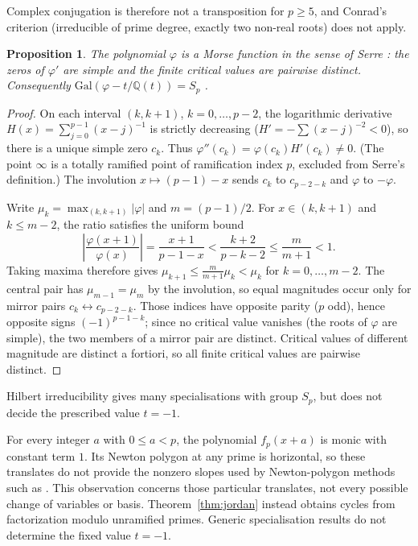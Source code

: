 \documentclass[11pt,a4paper]{amsart}
\newcommand{\Q}{\mathbb{Q}}
\newcommand{\Gal}{\mathrm{Gal}}
\theoremstyle{plain}
\newtheorem{proposition}[theorem]{Proposition}
\theoremstyle{definition}
\begin{document}
Complex conjugation is therefore not a transposition for \(p\ge5\), and Conrad's criterion (irreducible of prime degree, exactly two non-real roots) does not apply.

\begin{proposition}
\label{prop:morse}
The polynomial \(\varphi\) is a Morse function in the sense of Serre \cite[\S4.4]{SerreTopics}: the zeros of \(\varphi'\) are simple and the finite critical values are pairwise distinct. Consequently \(\Gal(\varphi-t/\Q(t))=S_p\) \cite[Thm.~4.4.5]{SerreTopics}.
\end{proposition}

\begin{proof}
On each interval \((k,k+1)\), \(k=0,\dots,p-2\), the logarithmic derivative \(H(x)=\sum_{j=0}^{p-1}(x-j)^{-1}\) is strictly decreasing (\(H'=-\sum(x-j)^{-2}<0\)), so there is a unique simple zero \(c_k\). Thus \(\varphi''(c_k)=\varphi(c_k)H'(c_k)\ne0\). (The point \(\infty\) is a totally ramified point of ramification index \(p\), excluded from Serre's definition.) The involution \(x\mapsto(p-1)-x\) sends \(c_k\) to \(c_{p-2-k}\) and \(\varphi\) to \(-\varphi\).

Write \(\mu_k=\max_{(k,k+1)}|\varphi|\) and \(m=(p-1)/2\). For \(x\in(k,k+1)\) and \(k\le m-2\), the ratio satisfies the uniform bound
\[
 \left|\frac{\varphi(x+1)}{\varphi(x)}\right|
 =\frac{x+1}{p-1-x}
 <\frac{k+2}{p-k-2}\le\frac{m}{m+1}<1.
\]
Taking maxima therefore gives \(\mu_{k+1}\le\frac{m}{m+1}\mu_k<\mu_k\) for \(k=0,\dots,m-2\). The central pair has \(\mu_{m-1}=\mu_m\) by the involution, so equal magnitudes occur only for mirror pairs \(c_k\leftrightarrow c_{p-2-k}\). Those indices have opposite parity (\(p\) odd), hence opposite signs \((-1)^{p-1-k}\); since no critical value vanishes (the roots of \(\varphi\) are simple), the two members of a mirror pair are distinct. Critical values of different magnitude are distinct a fortiori, so all finite critical values are pairwise distinct.
\end{proof}

Hilbert irreducibility gives many specialisations with group \(S_p\), but does not decide the prescribed value \(t=-1\).

For every integer \(a\) with \(0\le a<p\), the polynomial \(f_p(x+a)\) is monic with constant term \(1\). Its Newton polygon at any prime is horizontal, so these translates do not provide the nonzero slopes used by Newton-polygon methods such as \cite{Hajir}. This observation concerns those particular translates, not every possible change of variables or basis. Theorem~\ref{thm:jordan} instead obtains cycles from factorization modulo unramified primes. Generic specialisation results do not determine the fixed value \(t=-1\).
\end{document}
